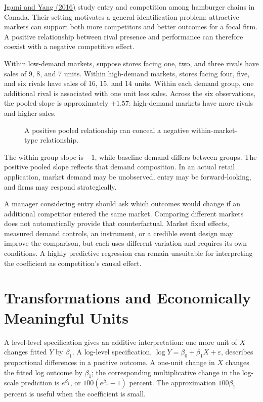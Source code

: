 \noindent \href{https://doi.org/10.3982/QE478}{Igami and Yang (2016)} study entry
and competition among hamburger chains in Canada. Their setting
motivates a general identification problem: attractive markets can
support both more competitors and better outcomes for a focal firm. A
positive relationship between rival presence and performance can
therefore coexist with a negative competitive effect.

Within low-demand markets, suppose stores facing one, two, and three
rivals have sales of 9, 8, and 7 units. Within high-demand markets,
stores facing four, five, and six rivals have sales of 16, 15, and 14
units. Within each demand group, one additional rival is associated with
one unit less sales. Across the six observations, the pooled slope is
approximately \(+1.57\): high-demand markets have more rivals and higher
sales.

\begin{figure}[htbp]
\centering

\caption{A positive pooled relationship can conceal a negative within-market-type relationship.}\label{fig:M03_omitted_demand}
\end{figure}

The within-group slope is \(-1\), while baseline demand differs between
groups. The positive pooled slope reflects that demand composition. In
an actual retail application, market demand may be unobserved, entry may
be forward-looking, and firms may respond strategically.

A manager considering entry should ask which outcomes would change if an
additional competitor entered the same market. Comparing different
markets does not automatically provide that counterfactual. Market fixed
effects, measured demand controls, an instrument, or a credible event
design may improve the comparison, but each uses different variation and
requires its own conditions. A highly predictive regression can remain
unsuitable for interpreting the coefficient as competition's causal
effect.

\hypertarget{M03-transformations-and-economically-meaningful-units}{%
\section{Transformations and Economically Meaningful
Units}\label{M03-transformations-and-economically-meaningful-units}}

\noindent A level-level specification gives an additive interpretation: one more
unit of \(X\) changes fitted \(Y\) by \(\beta_1\). A log-level
specification, \(\log Y=\beta_0+\beta_1X+\varepsilon\), describes
proportional differences in a positive outcome. A one-unit change in
\(X\) changes the fitted log outcome by \(\beta_1\); the corresponding
multiplicative change in the log-scale prediction is \(e^{\beta_1}\), or
\(100(e^{\beta_1}-1)\) percent. The approximation \(100\beta_1\) percent
is useful when the coefficient is small.

